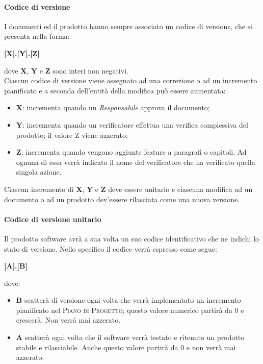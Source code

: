 \paragraph{Codice di versione}
\label{par:codice_versione}

I documenti ed il prodotto hanno sempre associato un codice di versione, che si presenta nella forma:
\begin{center}
    \textbf{[X].[Y].[Z]}
\end{center}
dove \textbf{X}, \textbf{Y} e \textbf{Z} sono interi non negativi.\\
Ciascun codice di versione viene assegnato ad una correzione o ad un incremento pianificato e a seconda dell'entit\`{a} della modifica
pu\`{o} essere aumentata:
\begin{itemize}
	\item \textbf{X}: incrementa quando un \emph{Responsabile} approva il documento;
	\item \textbf{Y}: incrementa quando un verificatore effettua una verifica complessiva del prodotto; il valore Z viene azzerato;
	\item \textbf{Z}: incrementa quando vengono aggiunte feature a paragrafi o capitoli. Ad ognuna di essa verrà indicato il nome del verificatore che ha verificato quella singola azione.
\end{itemize}
Ciascun incremento di \textbf{X}, \textbf{Y} e \textbf{Z} deve essere unitario e ciascuna modifica ad un documento o ad un prodotto
dev'essere rilasciata come una nuova versione.

\paragraph{Codice di versione unitario}
Il prodotto software avrà a sua volta un suo codice identificativo che ne indichi lo stato di versione. Nello specifico il codice verrà espresso come segue:\\
\begin{center}
    \textbf{[A].[B]}
\end{center}

dove:
\begin{itemize}
\item \textbf{B} scatterà di versione ogni volta che verrà implementato un incremento pianificato nel \textsc{Piano di Progetto}; questo valore numerico partirà da 0 e crescerà. Non verrà mai azzerato.
\item \textbf{A} scatterà ogni volta che il software verrà testato e ritenuto un prodotto stabile e rilasciabile. Anche questo valore partirà da 0 e non verrà mai azzerato.
\end{itemize}

